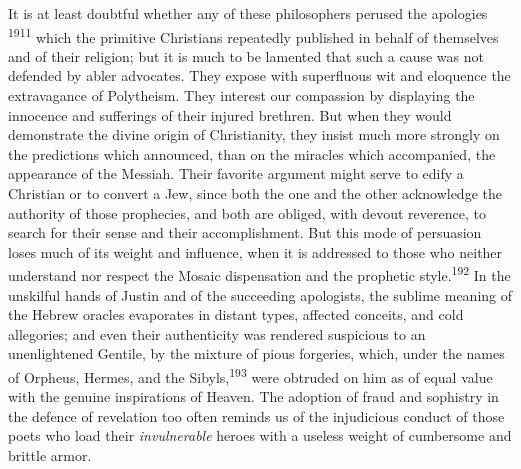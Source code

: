 It is at least doubtful whether any of these philosophers perused
the apologies \textsuperscript{1911} which the primitive Christians repeatedly
published in behalf of themselves and of their religion; but it
is much to be lamented that such a cause was not defended by
abler advocates. They expose with superfluous wit and eloquence
the extravagance of Polytheism. They interest our compassion by
displaying the innocence and sufferings of their injured
brethren. But when they would demonstrate the divine origin of
Christianity, they insist much more strongly on the predictions
which announced, than on the miracles which accompanied, the
appearance of the Messiah. Their favorite argument might serve to
edify a Christian or to convert a Jew, since both the one and the
other acknowledge the authority of those prophecies, and both are
obliged, with devout reverence, to search for their sense and
their accomplishment. But this mode of persuasion loses much of
its weight and influence, when it is addressed to those who
neither understand nor respect the Mosaic dispensation and the
prophetic style.\textsuperscript{192} In the unskilful hands of Justin and of the
succeeding apologists, the sublime meaning of the Hebrew oracles
evaporates in distant types, affected conceits, and cold
allegories; and even their authenticity was rendered suspicious
to an unenlightened Gentile, by the mixture of pious forgeries,
which, under the names of Orpheus, Hermes, and the Sibyls,\textsuperscript{193}
were obtruded on him as of equal value with the genuine
inspirations of Heaven. The adoption of fraud and sophistry in
the defence of revelation too often reminds us of the injudicious
conduct of those poets who load their \textit{invulnerable} heroes with
a useless weight of cumbersome and brittle armor.



